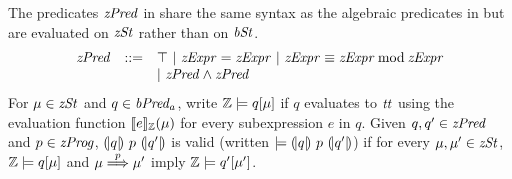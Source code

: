 The predicates $\mathit{zPred}$ in \zdsl share the same syntax as the algebraic predicates in \bvdsl but are evaluated on $\mathit{zSt}$ rather than on $\mathit{bSt}$.
\[
\begin{array}{rcl}
  \mathit{zPred} & ::= & \top \ |\ \mathit{zExpr} = \mathit{zExpr}\ |\ \mathit{zExpr} \equiv \mathit{zExpr} \mathbin{\textmd{mod}} \mathit{zExpr} \\
         &     & |\ \mathit{zPred} \wedge \mathit{zPred} \\
\end{array}
\]
For $\mu \in \mathit{zSt}$ and $q \in \mathit{bPred_a}$, write $\mathbb{Z} \models q[\mu]$ if $q$ evaluates to $\mathit{tt}$ using the evaluation function $[\![{e}]\!]_{\mathbb{Z}}(\mu)$ for every subexpression $e$ in $q$.
Given $q, q' \in \mathit{zPred}$ and $p \in \mathit{zProg}$, ${(\!|}{q}{|\!)}~{p}~{(\!|}{q'}{|\!)}$ is valid (written $\models {(\!|}{q}{|\!)}~{p}~{(\!|}{q'}{|\!)}$) if for every $\mu, \mu' \in \mathit{zSt}$, $\mathbb{Z} \models q[\mu]$ and $\mu \overset{p}{\Longrightarrow} \mu'$ imply $\mathbb{Z} \models q'[\mu']$.

